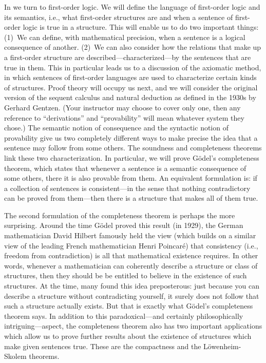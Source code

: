 In  we turn to first-order logic. We will define the
language of first-order logic and its semantics, i.e., what
first-order structures are and when a sentence of first-order logic is
true in a structure. This will enable us to do two important things:
(1)~We can define, with mathematical precision, when a sentence is a
logical consequence of another. (2)~We can also consider how the
relations that make up a first-order structure are
described---characterized---by the sentences that are true in them.
This in particular leads us to a discussion of the axiomatic method,
in which sentences of first-order languages are used to characterize
certain kinds of structures. Proof theory will occupy us next, and we
will consider the original version of the sequent calculus and natural
deduction as defined in the 1930s by Gerhard Gentzen. (Your instructor
may choose to cover only one, then any reference to ``derivations''
and ``provability'' will mean whatever system they chose.) The
semantic notion of consequence and the syntactic notion of provability
give us two completely different ways to make precise the idea that a
sentence may follow from some others. The soundness and completeness
theorems link these two characterization. In particular, we will prove
G\"odel's completeness theorem, which states that whenever a sentence
is a semantic consequence of some others, there it is also provable
from them. An equivalent formulation is: if a collection of sentences
is consistent---in the sense that nothing contradictory can be proved
from them---then there is a structure that makes all of them true.

The second formulation of the completeness theorem is perhaps the more
surprising. Around the time G\"odel proved this result (in 1929), the
German mathematician David Hilbert famously held the view (which builds on a similar view of the leading French mathematician Henri Poincar\'e) that
consistency (i.e., freedom from contradiction) is all that mathematical
existence requires. In other words, whenever a mathematician can
coherently describe a structure or class of structures, then they
should be be entitled to believe in the existence of such structures.
At the time, many found this idea preposterous: just because you can
describe a structure without contradicting yourself, it surely does
not follow that such a structure actually exists. But that is exactly
what G\"odel's completeness theorem says. In addition to this
paradoxical---and certainly philosophically intriguing---aspect, the
completeness theorem also has two important applications which allow
us to prove further results about the existence of structures which
make given sentences true. These are the compactness and the
L\"owenheim-Skolem theorems.


